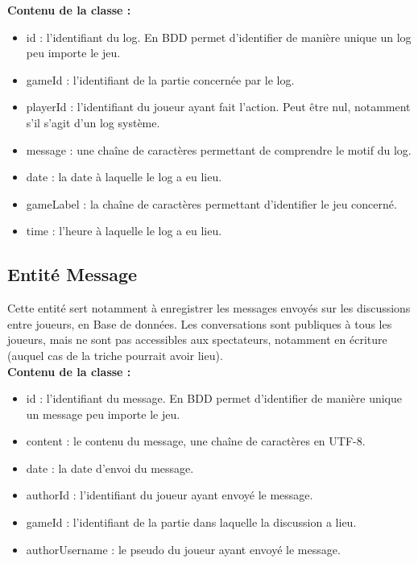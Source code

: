\documentclass{article}
\begin{document}
            \textbf{Contenu de la classe :}
                \begin{itemize}
                    \item id : l'identifiant du log. En BDD permet d'identifier de manière unique un log peu importe le jeu.
                    \item gameId : l'identifiant de la partie concernée par le log.
                    \item playerId : l'identifiant du joueur ayant fait l'action. Peut être nul, notamment s'il s'agit d'un log système.
                    \item message : une chaîne de caractères permettant de comprendre le motif du log.
                    \item date : la date à laquelle le log a eu lieu.
                    \item gameLabel : la chaîne de caractères permettant d'identifier le jeu concerné.
                    \item time : l'heure à laquelle le log a eu lieu.
                \end{itemize}

        \subsection{Entité Message}

            Cette entité sert notamment à enregistrer les messages envoyés sur les discussions entre joueurs, en Base de données. Les conversations sont publiques à tous les joueurs, mais ne sont pas accessibles aux spectateurs, notamment en écriture (auquel cas de la triche pourrait avoir lieu).\\

            \textbf{Contenu de la classe :}
                \begin{itemize}
                    \item id : l'identifiant du message. En BDD permet d'identifier de manière unique un message peu importe le jeu.
                    \item content : le contenu du message, une chaîne de caractères en UTF-8.
                    \item date : la date d'envoi du message.
                    \item authorId : l'identifiant du joueur ayant envoyé le message.
                    \item gameId : l'identifiant de la partie dans laquelle la discussion a lieu.
                    \item authorUsername : le pseudo du joueur ayant envoyé le message.
                \end{itemize}
\end{document}
